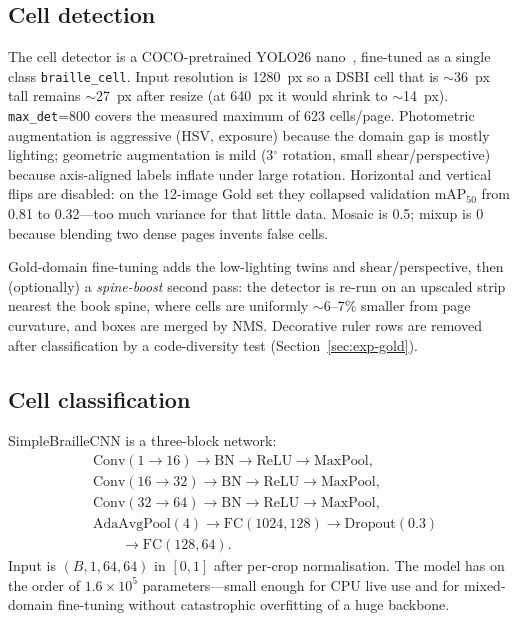 \documentclass[conference]{IEEEtran}
\begin{document}
\subsection{Cell detection}
\label{sec:cells}
The cell detector is a COCO-pretrained YOLO26 nano~\cite{yolo-ultralytics},
fine-tuned as a single class \texttt{braille\_cell}. Input resolution is
1280~px so a DSBI cell that is $\sim$36~px tall remains $\sim$27~px after
resize (at 640~px it would shrink to $\sim$14~px). \texttt{max\_det}=800
covers the measured maximum of 623 cells/page. Photometric augmentation is
aggressive (HSV, exposure) because the domain gap is mostly lighting;
geometric augmentation is mild (3$^\circ$ rotation, small shear/perspective)
because axis-aligned labels inflate under large rotation. Horizontal and
vertical flips are disabled: on the 12-image Gold set they collapsed
validation mAP$_{50}$ from 0.81 to 0.32---too much variance for that
little data. Mosaic is 0.5; mixup is 0 because blending two dense pages
invents false cells.

Gold-domain fine-tuning adds the low-lighting twins and
shear/perspective, then (optionally) a \textit{spine-boost} second pass:
the detector is re-run on an upscaled strip nearest the book spine, where
cells are uniformly $\sim$6--7\% smaller from page curvature, and boxes
are merged by NMS. Decorative ruler rows are removed after
classification by a code-diversity test (Section~\ref{sec:exp-gold}).

\subsection{Cell classification}
\label{sec:cnn}
SimpleBrailleCNN is a three-block network:
\begin{equation}
\begin{aligned}
&\mathrm{Conv}(1\!\to\!16)\!\to\!\mathrm{BN}\!\to\!\mathrm{ReLU}\!\to\!\mathrm{MaxPool},\\
&\mathrm{Conv}(16\!\to\!32)\!\to\!\mathrm{BN}\!\to\!\mathrm{ReLU}\!\to\!\mathrm{MaxPool},\\
&\mathrm{Conv}(32\!\to\!64)\!\to\!\mathrm{BN}\!\to\!\mathrm{ReLU}\!\to\!\mathrm{MaxPool},\\
&\mathrm{AdaAvgPool}(4)\!\to\!\mathrm{FC}(1024,128)\!\to\!\mathrm{Dropout}(0.3)\\
&\qquad\!\to\!\mathrm{FC}(128,64).
\end{aligned}
\end{equation}
Input is $(B,1,64,64)$ in $[0,1]$ after per-crop normalisation. The
model has on the order of $1.6\times 10^5$ parameters---small enough for
CPU live use and for mixed-domain fine-tuning without catastrophic
overfitting of a huge backbone.
\end{document}
